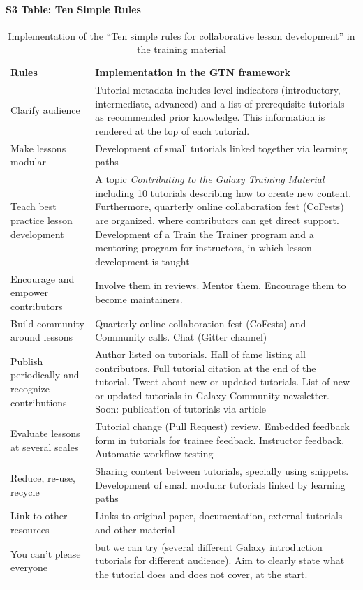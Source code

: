 \documentclass[10pt,letterpaper]{article}
\begin{document}
\paragraph{S3 Table: Ten Simple Rules}
\begin{table}[!ht]
	\centering
	\caption{Implementation of the ``Ten simple rules for collaborative lesson development''\cite{Devenyi_2018} in the training material
    \label{tbl:tensimplerules}}
	\begin{tabular}{p{}p{}}
		\textbf{Rules}                                      & \textbf{Implementation in the GTN framework} \\
		Clarify audience                                    & Tutorial metadata includes level indicators (introductory, intermediate, advanced) and a list of prerequisite tutorials as recommended prior knowledge. This information is rendered at the top of each tutorial. \\
		Make lessons modular                                & Development of small tutorials linked together via learning paths \\
		Teach best practice lesson development              & A topic \emph{Contributing to the Galaxy Training Material} including 10 tutorials describing how to create new content. Furthermore, quarterly online collaboration fest (CoFests) are organized, where contributors can get direct support. Development of a Train the Trainer program and a mentoring program for instructors, in which lesson development is taught \\
		Encourage and empower contributors                  & Involve them in reviews. Mentor them. Encourage them to become maintainers. \\
		Build community around lessons                      & Quarterly online collaboration fest (CoFests) and Community calls. Chat (Gitter channel) \\
		Publish periodically and recognize contributions    & Author listed on tutorials. Hall of fame listing all contributors. Full tutorial citation at the end of the tutorial. Tweet about new or updated tutorials. List of new or updated tutorials in Galaxy Community newsletter. Soon: publication of tutorials via article \\
		Evaluate lessons at several scales                  & Tutorial change (Pull Request) review. Embedded feedback form in tutorials for trainee feedback. Instructor feedback. Automatic workflow testing \\
		Reduce, re-use, recycle                             & Sharing content between tutorials, specially using snippets. Development of small modular tutorials linked by learning paths \\
		Link to other resources                             & Links to original paper, documentation, external tutorials and other material \\
		You can't please everyone                           & but we can try (several different Galaxy introduction tutorials for different audience). Aim to clearly state what the tutorial does and does not cover, at the start.  \\
	\end{tabular}
\end{table}
\end{document}
